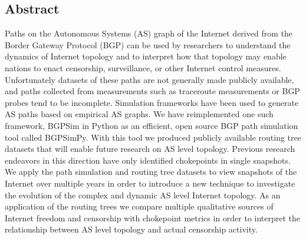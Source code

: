 \documentclass{article}
\begin{document}
\begin{multicols}{2}

\section{Abstract}     
Paths on the Autonomous Systems (AS) graph of the Internet
derived from the Border Gateway Protocol (BGP) can be used by researchers to
understand the dynamics of Internet topology and to interpret how that
topology may enable nations to enact censorship, surveillance, or other
Internet control measures. Unfortunately datasets of these paths are not
generally made publicly available, and paths collected from measurements such as
traceroute measurements or BGP probes tend to be incomplete. Simulation
frameworks have been used to generate AS paths based on empirical AS graphs.
We have reimplemented one such framework, BGPSim \cite{quicksand} in Python as
an efficient, open source BGP path simulation tool called BGPSimPy. With this
tool we produced publicly available routing tree datasets that will enable
future research on AS level topology. Previous research endeavors in this
direction have only identified chokepoints in single snapshots. We apply the
path simulation and routing tree datasets to view snapshots of the Internet
over multiple years in order to introduce a new technique to investigate the
evolution of the complex and dynamic AS level Internet topology. As an
application of the routing trees we compare multiple qualitative sources of
Internet freedom and censorship with chokepoint metrics in order to interpret
the relationship between AS level topology and actual censorship activity.


\end{multicols}
\end{document}
